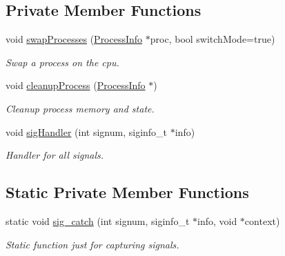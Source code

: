 \subsection*{\-Private \-Member \-Functions}
\begin{DoxyCompactItemize}
\item 
void \hyperlink{classcKernel_a1b8e06f240c1bb7d0c4d0d30bcc55e18}{swap\-Processes} (\hyperlink{structProcessInfo}{\-Process\-Info} $\ast$proc, bool switch\-Mode=true)
\begin{DoxyCompactList}\small\item\em \-Swap a process on the cpu. \end{DoxyCompactList}\item 
void \hyperlink{classcKernel_abcc0464e62a5fb82ddf4a3f8ba5ec461}{cleanup\-Process} (\hyperlink{structProcessInfo}{\-Process\-Info} $\ast$)
\begin{DoxyCompactList}\small\item\em \-Cleanup process memory and state. \end{DoxyCompactList}\item 
void \hyperlink{classcKernel_a60ccaffeee3cfcfdfb4aa7b9e33b19f4}{sig\-Handler} (int signum, siginfo\-\_\-t $\ast$info)
\begin{DoxyCompactList}\small\item\em \-Handler for all signals. \end{DoxyCompactList}\end{DoxyCompactItemize}
\subsection*{\-Static \-Private \-Member \-Functions}
\begin{DoxyCompactItemize}
\item 
\hypertarget{classcKernel_a571bb344ba50970d9c4a1cb5b500bbcd}{static void \hyperlink{classcKernel_a571bb344ba50970d9c4a1cb5b500bbcd}{sig\-\_\-catch} (int signum, siginfo\-\_\-t $\ast$info, void $\ast$context)}\label{db/da5/classcKernel_a571bb344ba50970d9c4a1cb5b500bbcd}

\begin{DoxyCompactList}\small\item\em \-Static function just for capturing signals. \end{DoxyCompactList}\end{DoxyCompactItemize}
